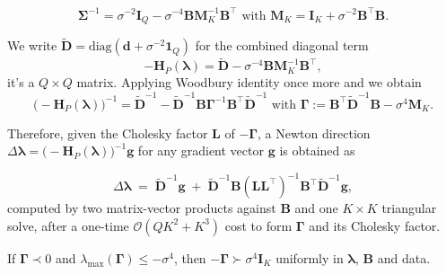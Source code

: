 \begin{equation}
    \bm{\Sigma}^{-1}=\sigma^{-2}\mathbf{I}_{Q}-\sigma^{-4}\mathbf{BM}_{K}^{-1}\mathbf{B}^{\top} \text{ with } \mathbf{M}_{K}=\mathbf{I}_{K}+\sigma^{-2}\mathbf{B}^{\top}\mathbf{B}.
    \label{eq:woodbury2}
\end{equation}

We write $\tilde{\mathbf{D}}=\text{diag}(\mathbf{d}+\sigma^{-2}\mathbf{1}_{Q})$ for the combined diagonal term
\begin{equation}
    -\mathbf{H}_{P}(\bm{\lambda})=\tilde{\mathbf{D}}-\sigma^{-4}\mathbf{BM}_{K}^{-1}\mathbf{B}^{\top},
    \label{eq:acceleration-hessian3}
\end{equation}
it's a $Q\times Q$ matrix. Applying Woodbury identity once more and we obtain
\begin{equation}
    \bigl(-\mathbf{H}_{P}(\bm{\lambda})\bigr)^{-1}=\tilde{\mathbf{D}}^{-1}-\tilde{\mathbf{D}}^{-1}\mathbf{B}\bm{\Gamma}^{-1}\mathbf{B}^{\top}\tilde{\mathbf{D}}^{-1} \text{ with } \bm{\Gamma}:=\mathbf{B}^{\top}\tilde{\mathbf{D}}^{-1}\mathbf{B}-\sigma^{4}\mathbf{M}_{K}.
    \label{eq:inverse-hessian4}
\end{equation}

Therefore, given the Cholesky factor $\mathbf{L}$ of $-\bm{\Gamma}$, a Newton direction $\Delta\bm{\lambda}=\bigl(-\mathbf{H}_{P}(\bm{\lambda})\bigr)^{-1}\mathbf{g}$ for any gradient vector $\mathbf{g}$ is obtained as

\begin{equation}
    \Delta\boldsymbol{\lambda} \;=\; \tilde{\mathbf{D}}^{-1}\mathbf{g} \;+\; \tilde{\mathbf{D}}^{-1}\mathbf{B}(\mathbf{L}\mathbf{L}^\top)^{-1}\mathbf{B}^\top\tilde{\mathbf{D}}^{-1}\mathbf{g},
    \label{eq:newton-direction5}
\end{equation}
computed by two matrix-vector products against $\mathbf{B}$ and one $K\times K$ triangular solve, after a one-time $\mathcal{O}(QK^{2}+K^{3})$ cost to form $\bm{\Gamma}$ and its Cholesky factor.

\begin{proposition}
    If $\bm{\Gamma}\prec 0$ and $\lambda_{\text{max}}(\bm{\Gamma})\leq -\sigma^{4}$, then $-\bm{\Gamma}\succ \sigma^{4}\mathbf{I}_{K}$ uniformly in $\bm{\lambda}$, $\mathbf{B}$ and data.
    \label{prop:negative-definiteness}
\end{proposition}

